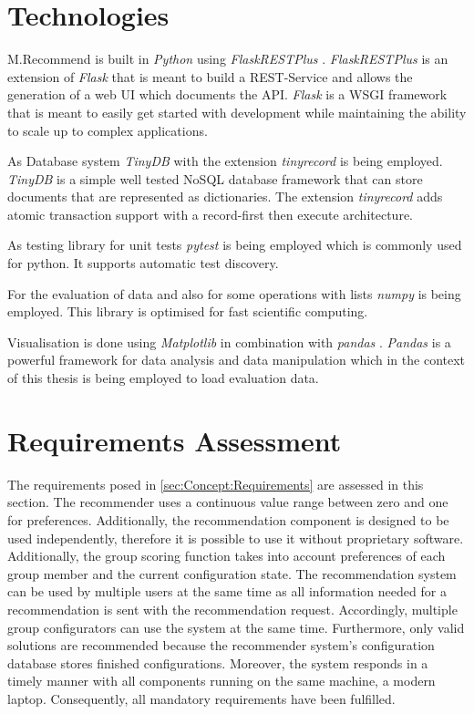 

\section{Technologies}
\label{sec:DesignImplementation:Technologies}

M.Recommend is built in \emph{Python} \cite{PythonOrg} using \emph{FlaskRESTPlus} \cite{FlaskRESTPlus13Documentation}. \emph{FlaskRESTPlus} is an extension of \emph{Flask} \cite{FlaskDocumentation} that is meant to build a REST-Service and allows the generation of a web UI which documents the API. \emph{Flask} is a WSGI \cite{WhatWSGI} framework that is meant to easily get started with development while maintaining the ability to scale up to complex applications.

As Database system \emph{TinyDB} \cite{TinyDB15Documentation} with the extension \emph{tinyrecord} \cite{junEugeneeeoTinyrecord2020} is being employed. \emph{TinyDB} is a simple well tested NoSQL database framework that can store documents that are represented as dictionaries. The extension \emph{tinyrecord} adds atomic transaction support with a record-first then execute architecture.

As testing library for unit tests \emph{pytest} \cite{PytestDocumentation} is being employed which is commonly used for python. It supports automatic test discovery.

For the evaluation of data and also for some operations with lists \emph{numpy} \cite{NumPy} is being employed. This library is optimised for fast scientific computing. 

Visualisation is done using \emph{Matplotlib} \cite{MatplotlibDocumentation} in combination with \emph{pandas} \cite{PandasPythonData}. \emph{Pandas} is a powerful framework for data analysis and data manipulation which in the context of this thesis is being employed to load evaluation data.


\section{Requirements Assessment}
\label{sec:DesignImplementation:RequirementsAssesment}

The requirements posed in \autoref{sec:Concept:Requirements} are assessed in this section. The recommender uses a continuous value range between zero and one for preferences. Additionally, the recommendation component is designed to be used independently, therefore it is possible to use it without proprietary software.
Additionally, the group scoring function takes into account preferences of each group member and the current configuration state. The recommendation system can be used by multiple users at the same time as all information needed for a recommendation is sent with the recommendation request. Accordingly, multiple group configurators can use the system at the same time. Furthermore, only valid solutions are recommended because the recommender system's configuration database stores finished configurations. Moreover, the system responds in a timely manner with all components running on the same machine, a modern laptop.
Consequently, all mandatory requirements have been fulfilled.

